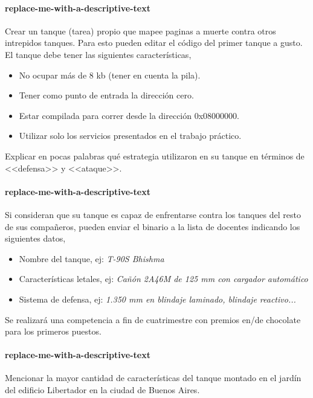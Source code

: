 \paragraph{replace-me-with-a-descriptive-text}\label{subsubsec:ej8-a}
Crear un tanque (tarea) propio que mapee paginas a muerte contra otros
intrepidos tanques. Para esto pueden editar el código del primer tanque a gusto.
El tanque debe tener las siguientes características,

\begin{itemize}
  \item No ocupar más de 8 kb (tener en cuenta la pila).
  \item Tener como punto de entrada la dirección cero.
  \item Estar compilada para correr desde la dirección 0x08000000.
  \item Utilizar solo los servicios presentados en el trabajo práctico.
\end{itemize}

Explicar en pocas palabras qué estrategia utilizaron en su tanque en términos de
<<defensa>> y <<ataque>>.
\hruler
{}

\paragraph{replace-me-with-a-descriptive-text}\label{subsubsec:ej8-b}
Si consideran que su tanque es capaz de enfrentarse contra los tanques del
resto de sus compañeros, pueden enviar el binario a la lista de docentes
indicando los siguientes datos,

\begin{itemize}
  \item Nombre del tanque, ej: \emph{T-90S Bhishma}
  \item Características letales, ej: \emph{Cañón 2A46M de 125 mm con cargador 
    automático}
  \item Sistema de defensa, ej: \emph{1.350 mm en blindaje laminado, blindaje 
    reactivo...}
\end{itemize}

Se realizará una competencia a fin de cuatrimestre con premios en/de chocolate
para los primeros puestos.
\hruler
{}

\paragraph{replace-me-with-a-descriptive-text}\label{subsubsec:ej8-c}
Mencionar la mayor cantidad de características del tanque montado en el jardín
del edificio Libertador en la ciudad de Buenos Aires.
\hruler
{}
